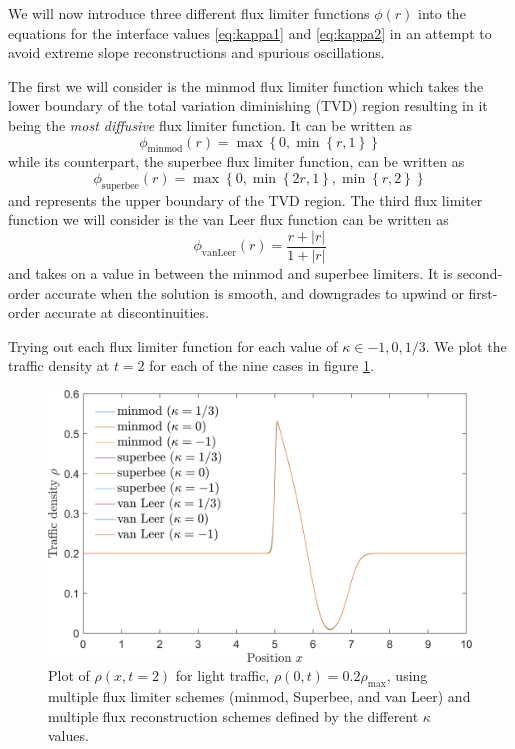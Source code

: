 \documentclass[11pt]{article}
\begin{document}
We will now introduce three different flux limiter functions $\phi(r)$ into the equations for the interface values \eqref{eq:kappa1} and \eqref{eq:kappa2} in an attempt to avoid extreme slope reconstructions and spurious oscillations.

The first we will consider is the minmod flux limiter function which takes the lower boundary of the total variation diminishing (TVD) region resulting in it being the \emph{most diffusive} flux limiter function. It can be written as
\begin{equation}
\phi_\mathrm{minmod}(r) = \max\left\{ 0, \min\left\{r,1\right\} \right\}
\end{equation}
while its counterpart, the superbee flux limiter function, can be written as 
\begin{equation}
\phi_\mathrm{superbee}(r) = \max \left\{ 0, \min\left\{2r,1\right\}, \min\left\{r,2\right\} \right\}
\end{equation}
and represents the upper boundary of the TVD region. The third flux limiter function we will consider is the van Leer flux function can be written as
\begin{equation}
\phi_\mathrm{van Leer}(r) = \frac{r + |r|}{1 + |r|}
\end{equation}
and takes on a value in between the minmod and superbee limiters. It is second-order accurate when the solution is smooth, and downgrades to upwind or first-order accurate at discontinuities.

Trying out each flux limiter function for each value of $\kappa \in {-1,0,1/3}$. We plot the traffic density at $t=2$ for each of the nine cases in figure \ref{fig:2b_all}.

\begin{figure}[h!]
  \centering
  \includegraphics[width=\textwidth]{2b_all.png}
  \caption{Plot of $\rho(x,t=2)$ for light traffic, $\rho(0,t) = 0.2\rho_\mathrm{max}$, using multiple flux limiter schemes (minmod, Superbee, and van Leer) and multiple flux reconstruction schemes defined by the different $\kappa$ values.}
  \label{fig:2b_all}
\end{figure}
\end{document}
